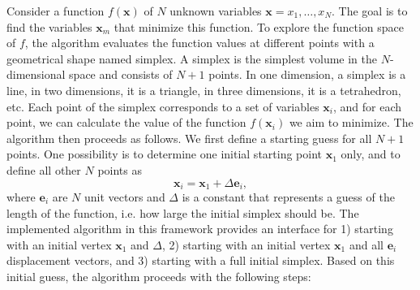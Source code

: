\documentclass[a4paper,11pt]{article}
\def\e{\boldsymbol{e}}
\def\x{\boldsymbol{x}}
\begin{document}
Consider a function $f(\x)$ of $N$ unknown variables $\x = x_1, \ldots, x_N$. The goal is to find the variables $\x_m$ that minimize this function. To explore the function space of $f$, the algorithm evaluates the function values at different points with a geometrical shape named simplex. A simplex is the simplest volume in the $N$-dimensional space and consists of $N+1$ points. In one dimension, a simplex is a line, in two dimensions, it is a triangle, in three dimensions, it is a tetrahedron, etc. Each point of the simplex corresponds to a set of variables $\x_i$, and for each point, we can calculate the value of the function $f(\x_i)$ we aim to minimize. The algorithm then proceeds as follows. We first define a starting guess for all $N+1$ points. One possibility is to determine one initial starting point $\x_1$ only, and to define all other $N$ points as
\begin{equation*}
 \x_i = \x_1 + \Delta \e_i,
\end{equation*}
where $\e_i$ are $N$ unit vectors and $\Delta$ is a constant that represents a guess of the length of the function, i.e. how large the initial simplex should be. The implemented algorithm in this framework provides an interface for 1) starting with an initial vertex $\x_1$ and $\Delta$, 2) starting with an initial vertex $\x_1$ and all $\e_i$ displacement vectors, and 3) starting with a full initial simplex. Based on this initial guess, the algorithm proceeds with the following steps:
\end{document}
